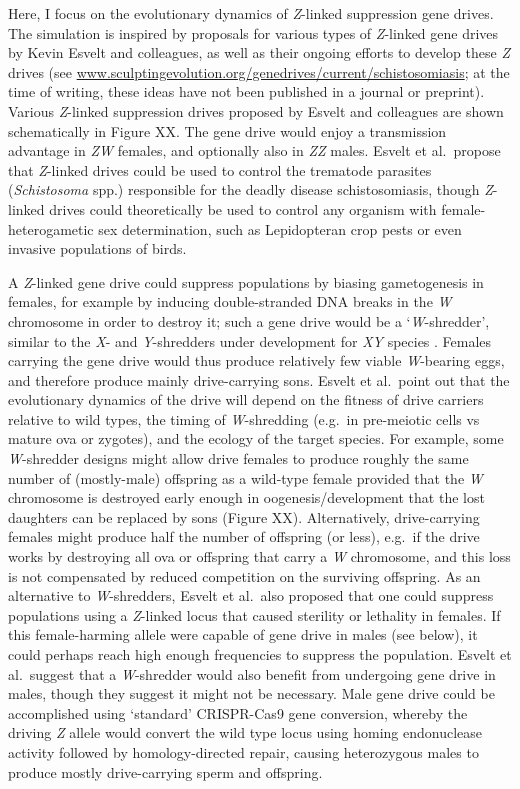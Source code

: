\documentclass[]{rsos}%
\begin{document}
Here, I focus on the evolutionary dynamics of \emph{Z}-linked
suppression gene drives. The simulation is inspired by proposals for
various types of \emph{Z}-linked gene drives by Kevin Esvelt and
colleagues, as well as their ongoing efforts to develop these \emph{Z}
drives (see
\href{}{www.sculptingevolution.org/genedrives/current/schistosomiasis};
at the time of writing, these ideas have not been published in a journal
or preprint). Various \emph{Z}-linked suppression drives proposed by
Esvelt and colleagues are shown schematically in Figure XX. The gene
drive would enjoy a transmission advantage in \emph{ZW} females, and
optionally also in \emph{ZZ} males. Esvelt et al.~propose that
\emph{Z}-linked drives could be used to control the trematode parasites
(\emph{Schistosoma} spp.) responsible for the deadly disease
schistosomiasis, though \emph{Z}-linked drives could theoretically be
used to control any organism with female-heterogametic sex
determination, such as Lepidopteran crop pests or even invasive
populations of birds.

A \emph{Z}-linked gene drive could suppress populations by biasing
gametogenesis in females, for example by inducing double-stranded DNA
breaks in the \emph{W} chromosome in order to destroy it; such a gene
drive would be a `\emph{W}-shredder', similar to the \emph{X}- and
\emph{Y}-shredders under development for \emph{XY} species
\citep{windbichler2008ta, north2013mo, galizi2014sy, burt2018se, papathanos2018re, prowse2019}.
Females carrying the gene drive would thus produce relatively few viable
\emph{W}-bearing eggs, and therefore produce mainly drive-carrying sons.
Esvelt et al.~point out that the evolutionary dynamics of the drive will
depend on the fitness of drive carriers relative to wild types, the
timing of \emph{W}-shredding (e.g.~in pre-meiotic cells vs mature ova or
zygotes), and the ecology of the target species. For example, some
\emph{W}-shredder designs might allow drive females to produce roughly
the same number of (mostly-male) offspring as a wild-type female
provided that the \emph{W} chromosome is destroyed early enough in
oogenesis/development that the lost daughters can be replaced by sons
(Figure XX). Alternatively, drive-carrying females might produce half
the number of offspring (or less), e.g.~if the drive works by destroying
all ova or offspring that carry a \emph{W} chromosome, and this loss is
not compensated by reduced competition on the surviving offspring. As an
alternative to \emph{W}-shredders, Esvelt et al.~also proposed that one
could suppress populations using a \emph{Z}-linked locus that caused
sterility or lethality in females. If this female-harming allele were
capable of gene drive in males (see below), it could perhaps reach high
enough frequencies to suppress the population. Esvelt et al.~suggest
that a \emph{W}-shredder would also benefit from undergoing gene drive
in males, though they suggest it might not be necessary. Male gene drive
could be accomplished using `standard' CRISPR-Cas9 gene conversion,
whereby the driving \emph{Z} allele would convert the wild type locus
using homing endonuclease activity followed by homology-directed repair,
causing heterozygous males to produce mostly drive-carrying sperm and
offspring.
\end{document}
